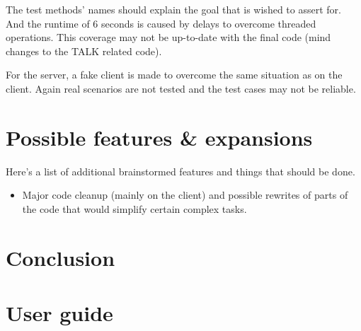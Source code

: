 \documentclass[12pt]{rapport}
\begin{document}
The test methods' names should explain the goal that is wished to
assert for. And the runtime of
{\selectfont\texttildelow}$6$ seconds is caused by
delays to overcome threaded operations. This coverage may not be
up-to-date with the final code (mind changes to the TALK related
code).

For the server, a fake client is made to overcome the same situation
as on the client. Again real scenarios are not tested and the test
cases may not be reliable.

\section*{Possible features \& expansions}
Here's a list of additional brainstormed features and things that
should be done.
\begin{itemize}
\item Major code cleanup (mainly on the client) and possible
  rewrites of parts of the code that would simplify certain complex
  tasks.
\end{itemize}


\newpage
\section*{Conclusion}




\newpage
\section*{User guide}
\end{document}
